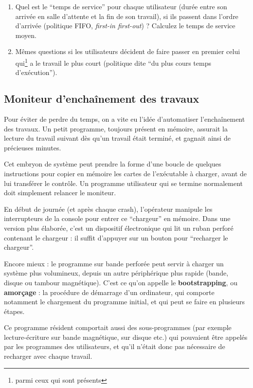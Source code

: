 \begin{multicols}{2}
\begin{exercice}
\begin{enumerate}
\item
Quel est le ``temps de service'' pour chaque utilisateur (durée entre
son arrivée en salle d'attente et la fin de son travail), si ils
passent dans l'ordre d'arrivée (politique FIFO, \emph{first-in first-out}) ? Calculez le
temps de service moyen.
\item
Mêmes questions si les utilisateurs décident de faire  passer en premier
celui  qui\footnote{parmi
  ceux qui sont présents} a le travail le plus court (politique dite ``du plus cours temps d'exécution'').
\end{enumerate}
\end{exercice}

\subsection{Moniteur d'enchaînement des travaux}

Pour éviter de perdre du temps, on a vite eu l'idée d'automatiser
l'enchaînement des travaux. Un petit programme, toujours présent en
mémoire, assurait la lecture du travail suivant dès qu'un travail
était terminé, et gagnait ainsi de précieuses minutes.

Cet embryon de système peut prendre la forme d'une boucle de quelques
instructions pour copier en mémoire les cartes de l'exécutable à
charger, avant de lui transférer le contrôle.  Un programme
utilisateur qui se termine normalement doit simplement relancer le
moniteur.

En début de journée (et après chaque crash), l'opérateur manipule les
interrupteurs de la console pour entrer ce ``chargeur'' en mémoire.
Dans une version plus élaborée, c'est un dispositif électronique qui lit
un ruban perforé contenant le chargeur : il suffit d'appuyer sur un bouton
pour ``recharger le chargeur''.

Encore mieux : le programme sur bande perforée peut servir à charger
un système plus volumineux, depuis un autre périphérique plus rapide
(bande, disque ou tambour magnétique). C'est ce qu'on appelle le
\textbf{bootstrapping}, ou \textbf{amorçage} : la procédure de
démarrage d'un ordinateur, qui comporte notamment le chargement du
programme initial, et qui peut se faire en plusieurs étapes.

Ce programme résident comportait aussi des sous-programmes (par
exemple lecture-écriture sur bande magnétique, sur disque etc.) qui
pouvaient être appelés par les programmes des utilisateurs, et qu'il
n'était donc pas nécessaire de recharger avec chaque travail.



\end{multicols}
